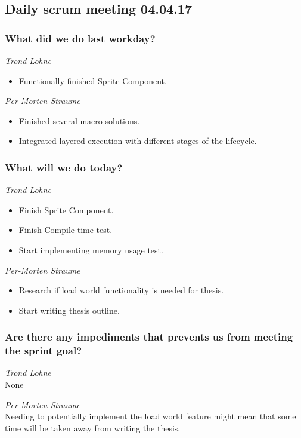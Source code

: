 \documentclass{article}
\begin{document}
\begin{center}
\subsection*{Daily scrum meeting 04.04.17}
\end{center}
\bigskip


\subsubsection*{What did we do last workday?}

\noindent\textit{Trond Lohne}
\begin{itemize}
	\item 
	Functionally finished Sprite Component.	
\end{itemize}

\medskip

\noindent\textit{Per-Morten Straume}
\begin{itemize}
	\item 
	Finished several macro solutions.
	
	\item 
	Integrated layered execution with different stages of the lifecycle.
\end{itemize}


\subsubsection*{What will we do today?}

\noindent\textit{Trond Lohne}
\begin{itemize}
	\item 
	Finish Sprite Component.
	
	\item 
    Finish Compile time test.
	
	\item 
	Start implementing memory usage test.
\end{itemize}

\medskip

\noindent\textit{Per-Morten Straume}
\begin{itemize}
	\item 
	Research if load world functionality is needed for thesis.
	
	\item 
	Start writing thesis outline.
\end{itemize}


\subsubsection*{Are there any impediments that prevents us from meeting the sprint goal?}

\noindent\textit{Trond Lohne}\\
None

\medskip

\noindent\textit{Per-Morten Straume}\\
Needing to potentially implement the load world feature might mean that some time will be taken away from writing the thesis.
\end{document}
